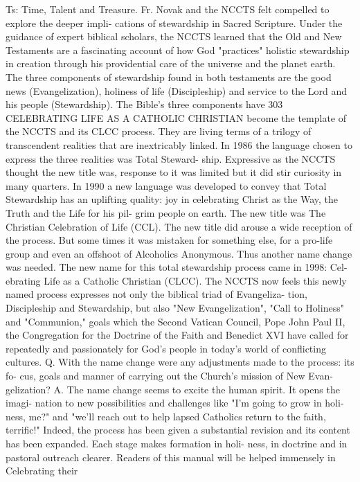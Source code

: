 \documentclass[oneside]{book}
\begin{document}
Ts: Time, Talent and Treasure.  Fr. Novak and the NCCTS felt compelled to
explore the deeper impli- cations of stewardship in Sacred Scripture. Under the
guidance of expert biblical scholars, the NCCTS learned that the Old and New
Testaments are a fascinating account of how God "practices" holistic stewardship
in creation through his providential care of the universe and the planet
earth. The three components of stewardship found in both testaments are the good
news (Evangelization), holiness of life (Discipleship) and service to the Lord
and his people (Stewardship). The Bible's three components have 303 CELEBRATING
LIFE AS A CATHOLIC CHRISTIAN become the template of the NCCTS and its CLCC
process. They are living terms of a trilogy of transcendent realities that are
inextricably linked. In 1986 the language chosen to express the three realities
was Total Steward- ship.  Expressive as the NCCTS thought the new title was,
response to it was limited but it did stir curiosity in many quarters. In 1990 a
new language was developed to convey that Total Stewardship has an uplifting
quality: joy in celebrating Christ as the Way, the Truth and the Life for his
pil- grim people on earth. The new title was The Christian Celebration of Life
(CCL). The new title did arouse a wide reception of the process. But some times
it was mistaken for something else, for a pro-life group and even an offshoot of
Alcoholics Anonymous. Thus another name change was needed.  The new name for
this total stewardship process came in 1998: Cel- ebrating Life as a Catholic
Christian (CLCC). The NCCTS now feels this newly named process expresses not
only the biblical triad of Evangeliza- tion, Discipleship and Stewardship, but
also "New Evangelization", "Call to Holiness" and "Communion," goals which the
Second Vatican Council, Pope John Paul II, the Congregation for the Doctrine of
the Faith and Benedict XVI have called for repeatedly and passionately for God's
people in today's world of conflicting cultures.  Q. With the name change were
any adjustments made to the process: its fo- cus, goals and manner of carrying
out the Church's mission of New Evan- gelization?  A. The name change seems to
excite the human spirit. It opens the imagi- nation to new possibilities and
challenges like "I'm going to grow in holi- ness, me?" and "we'll reach out to
help lapsed Catholics return to the faith, terrific!" Indeed, the process has
been given a substantial revision and its content has been expanded. Each stage
makes formation in holi- ness, in doctrine and in pastoral outreach
clearer. Readers of this manual will be helped immensely in Celebrating their
\end{document}
